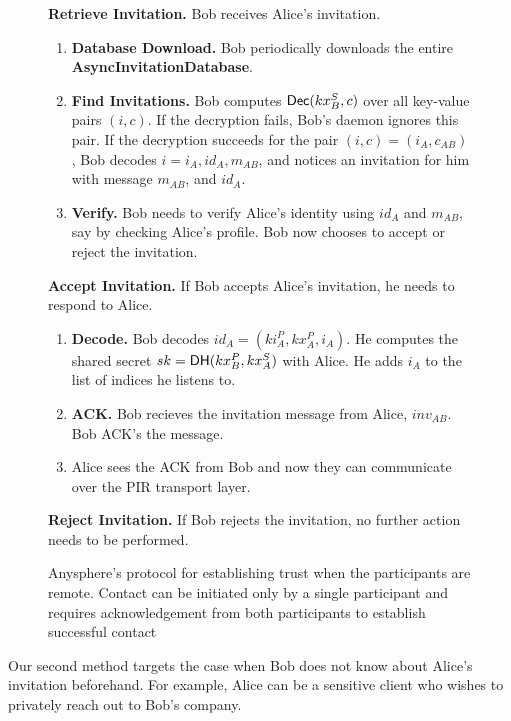 \begin{figure}[!th]
\begin{framed}
{\begin{hangparas}{1em}{1}
      \textbf{Retrieve Invitation.}
        Bob receives Alice's invitation.
        \begin{enumerate}
            \item \textbf{Database Download.} Bob periodically downloads the entire \textbf{AsyncInvitationDatabase}.
            \item \textbf{Find Invitations.} Bob computes $\mathsf{Dec}(kx^S_B, c)$ over all key-value pairs $(i, c)$. If the decryption fails, Bob's daemon ignores this pair. If the decryption succeeds for the pair $(i, c) = (i_A, c_{AB})$, Bob decodes $i = i_A, id_A, m_{AB}$, and notices an invitation for him with message $m_{AB}$, and $id_A$.
            \item \textbf{Verify.} Bob needs to verify Alice's identity using $id_A$ and $m_{AB}$, say by checking Alice's profile. Bob now chooses to accept or reject the invitation.
        \end{enumerate}

    \medskip

      \textbf{Accept Invitation.}
          If Bob accepts Alice's invitation, he needs to respond to Alice.
          \begin{enumerate}
              \item \textbf{Decode.} Bob decodes $id_A = (ki_A^P, kx_A^P, i_A)$. He computes the shared secret $sk =  \mathsf{DH}(kx_B^P, kx^S_A)$ with Alice. He adds $i_A$ to the list of indices he listens to.
              \item \textbf{ACK.} Bob recieves the invitation message from Alice, $inv_{AB}$. Bob ACK's the message.
              \item Alice sees the ACK from Bob and now they can communicate over the PIR transport layer.
          \end{enumerate}
    \medskip
          
      \textbf{Reject Invitation.}
        If Bob rejects the invitation, no further action needs to be performed.
  \end{hangparas}
  }
  \end{framed}
  \caption{Anysphere's protocol for establishing trust when the participants are remote. Contact can be initiated only by a single participant and requires acknowledgement from both participants to establish successful contact}
  \label{fig:trust-establishment-async}
\end{figure}



Our second method targets the case when Bob does not know about Alice's invitation beforehand. For example, Alice can be a sensitive client who wishes to privately reach out to Bob's company. 


